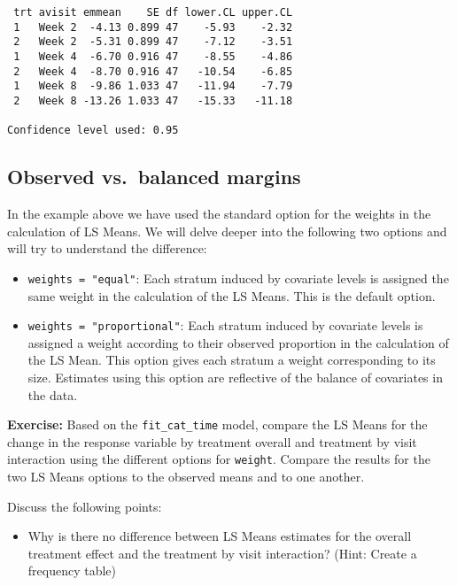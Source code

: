 \documentclass[
  letterpaper,
  DIV=11,
  numbers=noendperiod]{scrreprt}
\providecommand{\tightlist}{%
  \setlength{\itemsep}{0pt}\setlength{\parskip}{0pt}}\usepackage{longtable,booktabs,array}
\begin{document}
\begin{verbatim}
 trt avisit emmean    SE df lower.CL upper.CL
 1   Week 2  -4.13 0.899 47    -5.93    -2.32
 2   Week 2  -5.31 0.899 47    -7.12    -3.51
 1   Week 4  -6.70 0.916 47    -8.55    -4.86
 2   Week 4  -8.70 0.916 47   -10.54    -6.85
 1   Week 8  -9.86 1.033 47   -11.94    -7.79
 2   Week 8 -13.26 1.033 47   -15.33   -11.18

Confidence level used: 0.95 
\end{verbatim}

\hypertarget{observed-vs.-balanced-margins}{%
\subsection{Observed vs.~balanced
margins}\label{observed-vs.-balanced-margins}}

In the example above we have used the standard option for the weights in
the calculation of LS Means. We will delve deeper into the following two
options and will try to understand the difference:

\begin{itemize}
\item
  \texttt{weights\ =\ "equal"}: Each stratum induced by covariate levels
  is assigned the same weight in the calculation of the LS Means. This
  is the default option.
\item
  \texttt{weights\ =\ "proportional"}: Each stratum induced by covariate
  levels is assigned a weight according to their observed proportion in
  the calculation of the LS Mean. This option gives each stratum a
  weight corresponding to its size. Estimates using this option are
  reflective of the balance of covariates in the data.
\end{itemize}

\textbf{Exercise:} Based on the \texttt{fit\_cat\_time} model, compare
the LS Means for the change in the response variable by treatment
overall and treatment by visit interaction using the different options
for \texttt{weight}. Compare the results for the two LS Means options to
the observed means and to one another.

Discuss the following points:

\begin{itemize}
\tightlist
\item
  Why is there no difference between LS Means estimates for the overall
  treatment effect and the treatment by visit interaction? (Hint: Create
  a frequency table)
\end{itemize}
\end{document}
